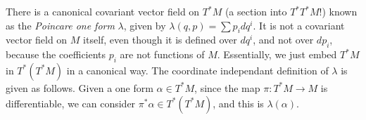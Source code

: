 \begin{example}

    There is a canonical covariant vector field on $T^* M$ (a section into $T^* T^* M$!) known as the {\it Poincare one form} $\lambda$, given by $\lambda(q,p) = \sum p_i dq^i$. It is not a covariant vector field on $M$ itself, even though it is defined over $dq^i$, and not over $dp_i$, because the coefficients $p_i$ are not functions of $M$. Essentially, we just embed $T^*M$ in $T^*(T^*M)$ in a canonical way. The coordinate independant definition of $\lambda$ is given as follows. Given a one form $\alpha \in T^* M$, since the map $\pi: T^* M \to M$ is differentiable, we can consider $\pi^* \alpha \in T^*(T^* M)$, and this is $\lambda(\alpha)$.


\end{example}

